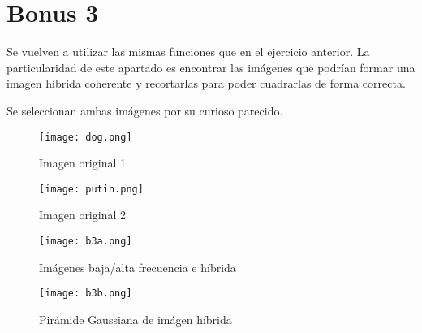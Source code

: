 \documentclass[11pt,floatsintext]{scrartcl} %
\begin{document}


\section{Bonus 3}

Se vuelven a utilizar las mismas funciones que en el ejercicio anterior.
La particularidad de este apartado es encontrar las imágenes que podrían formar
una imagen híbrida coherente y recortarlas para poder cuadrarlas de forma
correcta.\newline

Se seleccionan ambas imágenes por su curioso parecido.

\begin{figure}[h]
	\centering
	\texttt{[image: dog.png]}
	\caption{Imagen original 1}
\end{figure}

\begin{figure}[h]
	\centering
	\texttt{[image: putin.png]}
	\caption{Imagen original 2}
\end{figure}


\begin{figure}[h]
	\centering
	\texttt{[image: b3a.png]}
	\caption{Imágenes baja/alta frecuencia e híbrida}

	\centering
	\texttt{[image: b3b.png]}
	\caption{Pirámide Gaussiana de imágen híbrida}
\end{figure}
\end{document}

